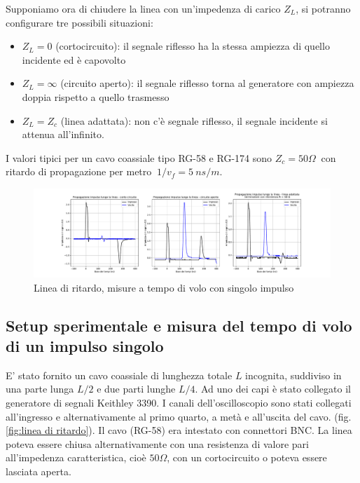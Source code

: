 \documentclass[journal]{IEEEtran}
\begin{document}
Supponiamo ora di chiudere la linea con un'impedenza di carico $Z_L$, si potranno configurare tre possibili situazioni: 
\begin{itemize}
    \item $Z_L = 0$ (cortocircuito): il segnale riflesso ha la stessa ampiezza di quello incidente ed è capovolto
    \item $Z_L = \infty$ (circuito aperto): il segnale riflesso torna al generatore con ampiezza doppia rispetto a quello trasmesso
    \item $Z_L = Z_c$ (linea adattata): non c'è segnale riflesso, il segnale incidente si attenua all'infinito.
\end{itemize}

I valori tipici per un cavo coassiale tipo RG-58 e RG-174 sono $Z_c = 50 \Omega \ $ con ritardo di propagazione per metro $  \ 1/v_f = 5 \ ns/m $.

\begin{figure}[h]%
\centering
\begin{center}
\includegraphics[trim = {150pt 0 0 0}, width=1.1\textwidth]{analysis/output/Delay_line_pulse.pdf}
\caption{Linea di ritardo, misure a tempo di volo con singolo impulso}
\label{fig:singolo impulso}
\end{center}
\end{figure}


\subsection{Setup sperimentale e misura del tempo di volo  di un impulso singolo}
E' stato fornito un cavo coassiale di lunghezza totale $L$ incognita, suddiviso in una parte lunga $L/2$ e due parti lunghe $L/4$. Ad uno dei capi è stato collegato il generatore di segnali Keithley 3390. I canali dell'oscilloscopio sono stati collegati all'ingresso e alternativamente al primo quarto, a metà e all'uscita del cavo. (fig. \ref{fig:linea di ritardo}). Il cavo (RG-58) era intestato con connettori BNC.
La linea poteva essere chiusa alternativamente con una resistenza di valore pari all'impedenza caratteristica, cioè $50 \Omega$, con un cortocircuito o poteva essere lasciata aperta.
\end{document}
